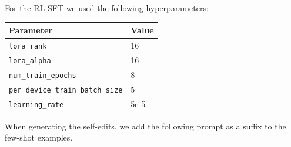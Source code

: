 \documentclass{article}
\begin{document}
\vspace{1em}

For the RL SFT we used the following hyperparameters:
\begin{center}
\begin{tabular}{|l|l|}
\hline
\textbf{Parameter} & \textbf{Value} \\
\hline
\texttt{lora\_rank} & 16 \\
\texttt{lora\_alpha} & 16 \\
\texttt{num\_train\_epochs} & 8 \\
\texttt{per\_device\_train\_batch\_size} & 5 \\
\texttt{learning\_rate} & 5e-5 \\
\hline
\end{tabular}
\end{center}

When generating the self-edits, we add the following prompt as a suffix to the few-shot examples.
\end{document}
